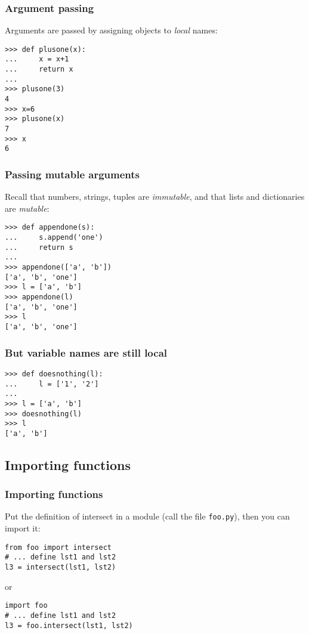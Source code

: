 \begin{frame}[fragile]
  \frametitle{Argument passing}

  Arguments are passed by assigning objects to \emph{local} names:

\begin{verbatim}
>>> def plusone(x):
...     x = x+1
...     return x
... 
>>> plusone(3)     
4
>>> x=6
>>> plusone(x)
7
>>> x
6
\end{verbatim}  
\end{frame}

\begin{frame}[fragile]
  \frametitle{Passing mutable arguments}

  Recall that numbers, strings, tuples are \emph{immutable}, and that
  lists and dictionaries are \emph{mutable}:
{\small
\begin{verbatim}
>>> def appendone(s):
...     s.append('one')
...     return s
... 
>>> appendone(['a', 'b'])
['a', 'b', 'one']
>>> l = ['a', 'b']
>>> appendone(l)
['a', 'b', 'one']
>>> l
['a', 'b', 'one']
\end{verbatim}}
\end{frame}

\begin{frame}[fragile]
  \frametitle{But variable names are still local}

\begin{verbatim}
>>> def doesnothing(l):
...     l = ['1', '2']
... 
>>> l = ['a', 'b']
>>> doesnothing(l)
>>> l
['a', 'b']
\end{verbatim}
\end{frame}

\subsection{Importing functions}
\begin{frame}[fragile]
  \frametitle{Importing functions}

    Put the definition of intersect in a module (call the file
    \texttt{foo.py}), then you can import it:  
    
    \pause
\begin{verbatim}
from foo import intersect
# ... define lst1 and lst2
l3 = intersect(lst1, lst2)
\end{verbatim}

    \pause
    or
\begin{verbatim}
import foo
# ... define lst1 and lst2
l3 = foo.intersect(lst1, lst2)
\end{verbatim}
\end{frame}

